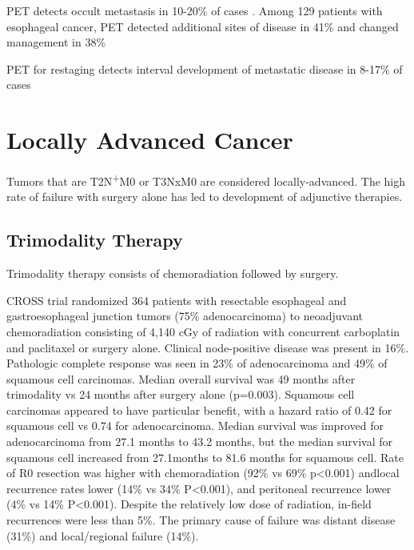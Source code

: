 \documentclass[
]{book}
\begin{document}
PET detects occult metastasis in 10-20\% of cases \citep[\citet{kim403}]{kato921}. Among 129 patients with esophageal cancer, PET detected additional sites of disease in 41\% and changed management in 38\% \citep{chatterton354}

PET for restaging detects interval development of metastatic disease in 8-17\% of cases \citep{vanvliet547}

\hypertarget{locally_advanced}{%
\chapter{Locally Advanced Cancer}\label{locally_advanced}}

Tumors that are T2N\textsuperscript{+}M0 or T3NxM0 are considered locally-advanced. The high rate of failure with surgery alone has led to development of adjunctive therapies.

\hypertarget{trimodality}{%
\section{Trimodality Therapy}\label{trimodality}}

Trimodality therapy consists of chemoradiation followed by surgery.

CROSS trial randomized 364 patients with resectable esophageal and gastroesophageal junction tumors (75\% adenocarcinoma) to neoadjuvant chemoradiation consisting of 4,140 cGy of radiation with concurrent carboplatin and paclitaxel or surgery alone.\citep{vanhagen2074} Clinical node-positive disease was present in 16\%. Pathologic complete response was seen in 23\% of adenocarcinoma and 49\% of squamous cell carcinomas. Median overall survival was 49 months after trimodality vs 24 months after surgery alone (p=0.003). Squamous cell carcinomas appeared to have particular benefit, with a hazard ratio of 0.42 for squamous cell vs 0.74 for adenocarcinoma. Median survival was improved for adenocarcinoma from 27.1 months to 43.2 months, but the median survival for squamous cell increased from 27.1months to 81.6 months for squamous cell. Rate of R0 resection was higher with chemoradiation (92\% vs 69\% p\textless0.001) andlocal recurrence rates lower (14\% vs 34\% P\textless0.001), and peritoneal recurrence lower (4\% vs 14\% P\textless0.001). Despite the relatively low dose of radiation, in-field recurrences were less than 5\%. The primary cause of failure was distant disease (31\%) and local/regional failure (14\%).\citep{oppedijk385}
\end{document}

